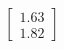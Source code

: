 \documentclass[preview]{standalone}
\begin{document}
\begin{align*}
\begin{bmatrix} 1.63 \\ 1.82 \end{bmatrix}
\end{align*}
\end{document}
